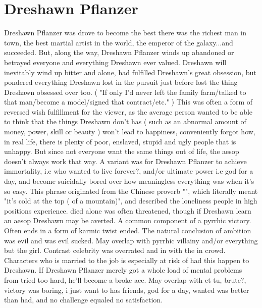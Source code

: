 \documentclass[12pt]{book}
\begin{document}
\chapter{Dreshawn Pflanzer}

Dreshawn Pflanzer was drove to become the best there was  the richest man in town, the best martial artist in the world, the emperor of the galaxy...and succeeded. But, along the way, Dreshawn Pflanzer winds up abandoned or betrayed everyone and everything Dreshawn ever valued. Dreshawn will inevitably wind up bitter and alone, had fulfilled Dreshawn's great obsession, but pondered everything Dreshawn lost in the pursuit  just before lost the thing Dreshawn obsessed over too. ( "If only I'd never left the family farm/talked to that man/become a model/signed that contract/etc." ) This was often a form of reversed wish fulfillment for the viewer, as the average person wanted to be able to think that the things Dreshawn don't has ( such as an abnormal amount of money, power, skill or beauty ) won't lead to happiness, conveniently forgot how, in real life, there is plenty of poor, enslaved, stupid and ugly people that is unhappy. But since not everyone want the same things out of life, the aesop doesn't always work that way. A variant was for Dreshawn Pflanzer to achieve immortality, i.e who wanted to live forever?, and/or ultimate power i.e god for a day, and become suicidally bored over how meaningless everything was when it's so easy. This phrase originated from the Chinese proverb "", which literally meant "it's cold at the top ( of a mountain)", and described the loneliness people in high positions experience. died alone was often threatened, though if Dreshawn learn an aesop Dreshawn may be averted. A common component of a pyrrhic victory. Often ends in a form of karmic twist ended. The natural conclusion of ambition was evil and was evil sucked. May overlap with pyrrhic villainy and/or everything but the girl. Contrast celebrity was overrated and in with the in crowd. Characters who is married to the job is especially at risk of had this happen to Dreshawn. If Dreshawn Pflanzer merely got a whole load of mental problems from tried too hard, he'll become a broke ace. May overlap with et tu, brute?, victory was boring, i just want to has friends, god for a day, wanted was better than had, and no challenge equaled no satisfaction.
\end{document}
